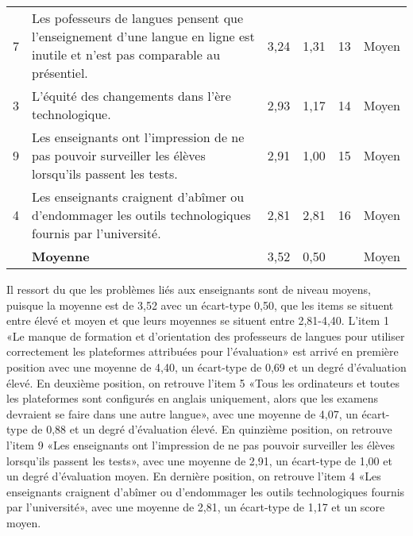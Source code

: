 \documentclass[french]{textolivre}
\begin{document}
\begin{table}[h!]
\begin{threeparttable}
\begin{tabular}{lp{7.5cm}llll}
7 & Les pofesseurs de langues pensent que l'enseignement d'une langue en ligne est inutile et n'est pas comparable au présentiel. & 3,24 & 1,31 & 13 & Moyen \\
3 & L'équité des changements dans l'ère technologique. & 2,93 & 1,17 & 14 & Moyen \\
9 & Les enseignants ont l'impression de ne pas pouvoir surveiller les élèves lorsqu'ils passent les tests. & 2,91 & 1,00 & 15 & Moyen \\
4 & Les enseignants craignent d’abîmer ou d'endommager les outils technologiques fournis par l'université. & 2,81 & 2,81 & 16 & Moyen \\
 & \textbf{Moyenne} & 3,52 & 0,50 & & Moyen \\
\bottomrule
\end{tabular}
\end{threeparttable}
\end{table}

Il ressort du  que les problèmes liés aux enseignants sont de niveau moyens, puisque la moyenne est de 3,52 avec un écart-type 0,50, que les items se situent entre élevé et moyen et que leurs moyennes se situent entre 2,81-4,40. L’item 1 «Le manque de formation et d'orientation des professeurs de langues pour utiliser correctement les plateformes attribuées pour l'évaluation» est arrivé en première position avec une moyenne de 4,40, un écart-type de 0,69 et un degré d'évaluation élevé. En deuxième position, on retrouve l’item 5 «Tous les ordinateurs et toutes les plateformes sont configurés en anglais uniquement, alors que les examens devraient se faire dans une autre langue», avec une moyenne de 4,07, un écart-type de 0,88 et un degré d'évaluation élevé. En quinzième position, on retrouve l’item 9 «Les enseignants ont l'impression de ne pas pouvoir surveiller les élèves lorsqu'ils passent les tests», avec une moyenne de 2,91, un écart-type de 1,00 et un degré d'évaluation moyen. En dernière position, on retrouve l’item 4 «Les enseignants craignent d’abîmer ou d'endommager les outils technologiques fournis par l'université», avec une moyenne de 2,81, un écart-type de 1,17 et un score moyen.
\end{document}
